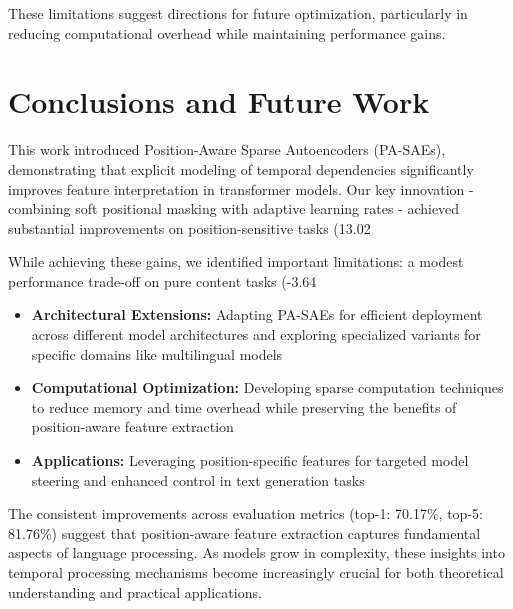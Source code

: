 \documentclass{article} %
\begin{document}
These limitations suggest directions for future optimization, particularly in reducing computational overhead while maintaining performance gains.

\section{Conclusions and Future Work}
\label{sec:conclusion}

This work introduced Position-Aware Sparse Autoencoders (PA-SAEs), demonstrating that explicit modeling of temporal dependencies significantly improves feature interpretation in transformer models. Our key innovation - combining soft positional masking with adaptive learning rates - achieved substantial improvements on position-sensitive tasks (13.02%

While achieving these gains, we identified important limitations: a modest performance trade-off on pure content tasks (-3.64%

\begin{itemize}
    \item \textbf{Architectural Extensions:} Adapting PA-SAEs for efficient deployment across different model architectures and exploring specialized variants for specific domains like multilingual models \cite{vaswani2017attention}
    \item \textbf{Computational Optimization:} Developing sparse computation techniques to reduce memory and time overhead while preserving the benefits of position-aware feature extraction \cite{Olshausen1997SparseCW}
    \item \textbf{Applications:} Leveraging position-specific features for targeted model steering and enhanced control in text generation tasks \cite{goodfellow2016deep}
\end{itemize}

The consistent improvements across evaluation metrics (top-1: 70.17\%, top-5: 81.76\%) suggest that position-aware feature extraction captures fundamental aspects of language processing. As models grow in complexity, these insights into temporal processing mechanisms become increasingly crucial for both theoretical understanding and practical applications.



\end{document}
